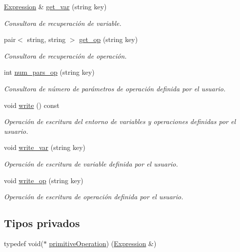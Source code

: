 \begin{DoxyCompactItemize}
\hyperlink{class_expression}{Expression} \& \hyperlink{class_environment_a98714eb7df497e1c53fdd0c2c33927f4}{get\+\_\+var} (string key)
\begin{DoxyCompactList}\small\item\em Consultora de recuperación de variable. \end{DoxyCompactList}\item 
pair$<$ string, string $>$ \hyperlink{class_environment_a4fdfff3f61445ed265c399c2353483fe}{get\+\_\+op} (string key)
\begin{DoxyCompactList}\small\item\em Consultora de recuperación de operación. \end{DoxyCompactList}\item 
int \hyperlink{class_environment_a22ef2de52498e9f0a7491c85e2148f83}{num\+\_\+pars\+\_\+op} (string key)
\begin{DoxyCompactList}\small\item\em Consultora de número de parámetros de operación definida por el usuario. \end{DoxyCompactList}\item 
void \hyperlink{class_environment_ae219751d8017a3ca66b11b74fd45cf9c}{write} () const 
\begin{DoxyCompactList}\small\item\em Operación de escritura del entorno de variables y operaciones definidas por el usuario. \end{DoxyCompactList}\item 
void \hyperlink{class_environment_a2fda411113f72e6e86176b8f00fcc9d7}{write\+\_\+var} (string key)
\begin{DoxyCompactList}\small\item\em Operación de escritura de variable definida por el usuario. \end{DoxyCompactList}\item 
void \hyperlink{class_environment_a6f449052df64c7f8bf44428835dc3d7b}{write\+\_\+op} (string key)
\begin{DoxyCompactList}\small\item\em Operación de escritura de operación definida por el usuario. \end{DoxyCompactList}\end{DoxyCompactItemize}
\subsection*{Tipos privados}
\begin{DoxyCompactItemize}
\item 
typedef void($\ast$ \hyperlink{class_environment_a3d2dfb3b9d5843e64fd24e5a2008029d}{primitive\+Operation}) (\hyperlink{class_expression}{Expression} \&)
\end{DoxyCompactItemize}
